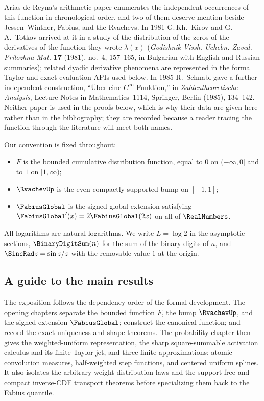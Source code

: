 \documentclass[11pt,oneside]{article}
\theoremstyle{definition}
\theoremstyle{remark}
\begin{document}
Arias de Reyna's arithmetic paper \cite{arias2018} enumerates the independent occurrences of
this function in chronological order, and two of them deserve mention beside Jessen--Wintner,
Fabius, and the Rvachevs.  In 1981 G.\,Kh.~Kirov and G.\,A.~Totkov arrived at it in a study
of the distribution of the zeros of the derivatives of the function they wrote $\lambda(x)$
(\emph{Godishnik Vissh. Uchebn. Zaved. Prilozhna Mat.} \textbf{17} (1981), no.~4, 157--165,
in Bulgarian with English and Russian summaries); related dyadic derivative phenomena are
represented in the formal Taylor and exact-evaluation APIs used below.  In
1985 R.~Schnabl gave a further independent construction, ``Über eine $C^\infty$-Funktion,''
in \emph{Zahlentheoretische Analysis}, Lecture Notes in Mathematics~1114, Springer, Berlin
(1985), 134--142.  Neither paper is used in the proofs below, which is why their data are
given here rather than in the bibliography; they are recorded because a reader tracing the
function through the literature will meet both names.

Our convention is fixed throughout:

\begin{itemize}
\item $F$ is the bounded cumulative distribution function, equal to $0$ on
      $(-\infty,0]$ and to $1$ on $[1,\infty)$;
\item $\RvachevUp$ is the even compactly supported bump on $[-1,1]$;
\item $\FabiusGlobal$ is the signed global extension satisfying
      $\FabiusGlobal'(x)=2\FabiusGlobal(2x)$ on all of $\RealNumbers$.
\end{itemize}

All logarithms are natural logarithms.  We write $L=\log2$ in the asymptotic sections,
$\BinaryDigitSum(n)$ for the sum of the binary digits of $n$, and
$\SincRad z=\sin z/z$ with the removable value $1$ at the origin.



\subsection{A guide to the main results}
\label{sec:aud-roadmap}

The exposition follows the dependency order of the formal development.  The opening chapters
separate the bounded function \(F\), the bump \(\RvachevUp\), and the signed extension
\(\FabiusGlobal\); construct the canonical function; and record the exact uniqueness and shape
theorems.  The probability chapter then gives the weighted-uniform representation, the sharp
square-summable activation calculus and its finite Taylor jet, and three finite approximations:
atomic convolution
measures, half-weighted step functions, and centered uniform splines.  It also isolates the
arbitrary-weight distribution laws and the
support-free and compact inverse-CDF transport theorems before specializing them back to the Fabius
quantile.
\end{document}
